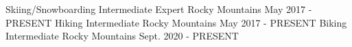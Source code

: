 

\begin{cventries}

  \cventry
    {Skiing/Snowboarding} %
    {Intermediate Expert} %
    {Rocky Mountains} %
    {May 2017 - PRESENT} %
    {} %
    {} %
  \cventry
    {Hiking} %
    {Intermediate} %
    {Rocky Mountains} %
    {May 2017 - PRESENT} %
    {} %
    {} %
  \cventry
    {Biking} %
    {Intermediate} %
    {Rocky Mountains} %
    {Sept. 2020 - PRESENT} %
    {} %
    {} %
\end{cventries}
